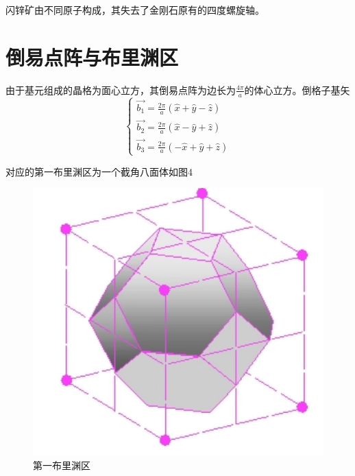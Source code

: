\documentclass{article}
\begin{document}
闪锌矿由不同原子构成，其失去了金刚石原有的四度螺旋轴。
	
	\section{倒易点阵与布里渊区}
由于基元组成的晶格为面心立方，其倒易点阵为边长为$ \frac{4\pi}{a} $的体心立方。倒格子基矢
\begin{equation}
	\begin{cases}
		\vec{b_1}=\frac{2\pi}{a}(\hat{x}+\hat{y}-\hat{z})\\
		\vec{b_2}=\frac{2\pi}{a}(\hat{x}-\hat{y}+\hat{z})\\
		\vec{b_3}=\frac{2\pi}{a}(-\hat{x}+\hat{y}+\hat{z})
	\end{cases}
\end{equation}


对应的第一布里渊区为一个截角八面体如图4
\begin{figure}[!h]
	
	\centering
	\includegraphics[scale=0.2]{布里渊区}
	\caption{\heiti{}第一布里渊区}
	
\end{figure}
\end{document}
